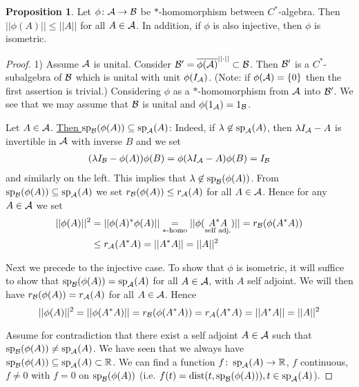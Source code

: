 \documentclass[10pt,english,a4paper]{article}
\theoremstyle{definition}
\newtheorem*{proposition}{Proposition}
\DeclareMathOperator{\Sp}{sp}
\begin{document}
\begin{proposition}
    Let $\phi \colon \mathcal{A}\to\mathcal{B}$ be $*$-homomorphism between $C^*$-algebra. 
Then $||\phi(A)|| \leq ||A||$ for all $A \in \mathcal{A}$. In addition, 
if $\phi$ is also injective, then $\phi$ is isometric.
\end{proposition}
\begin{proof}
    1) Assume $\mathcal{A}$ is unital. Consider $\mathcal{B}' = \overline{\phi(\mathcal{A})}^{||\cdot||} \subset \mathcal{B}$.
    Then $\mathcal{B}'$ is a $C^*$-subalgebra of $\mathcal{B}$ which is unital with unit $\phi(I_{\mathcal{A}})$.
    (Note: if $\phi(\mathcal{A})  = \{0\}$ then the first assertion is trivial.) Considering 
    $\phi$ as a $*$-homomorphism from $\mathcal{A}$ into $\mathcal{B}'$. We see that we may assume that 
$\mathcal{B}$ is unital and $\phi(1_{\mathcal{A}}) = 1_{\mathcal{B}}$. 

Let $A \in \mathcal{A}$. \ul{Then $\Sp_{\Bs}(\phi(A))\subseteq \Sp_{\As}(A)$}:
Indeed, if $\la \not\in \Sp_{\As}(A)$, then $\lambda I_{\mathcal{A}} - A$ is invertible in 
$\mathcal{A}$ with inverse $B$ and we set 
\begin{align*}
    (\lambda I_{\mathcal{B}} - \phi(A) )\phi(B) = \phi(\lambda I_{\mathcal{A}} - A)\phi(B) = I_{\mathcal{B}}
\end{align*}
and similarly on the left. This implies that $\la \not \in \Sp_{\Bs}(\phi(A))$. 
From $\Sp_{\Bs}(\phi(A))\subseteq \Sp_{\As}(A)$ we set 
$r_{\mathcal{B}} (\phi(A)) \leq r_{\mathcal{A}}(A)$ for all $A \in \mathcal{A}$. Hence for any $A \in \mathcal{A}$
we set 
\begin{align*}
    ||\phi(A)||^2 &= ||\phi(A)^*\phi(A)|| \underset{*\text{-homo}}{=}
    ||\phi(\underset{\text{self adj.}}{A^*A})|| = r_{\mathcal{B}}(\phi(A^*A)) \\
    &\leq r_{\mathcal{A}}(A^*A) = ||A^*A|| = ||A||^2
\end{align*}

Next we precede to the injective case. To show that $\phi$ is isometric, it will 
suffice to show that $\Sp_{\Bs}(\phi(A)) = \Sp_{\As}(A)$ for all $A \in \mathcal{A}$, with $A$ self adjoint.
We will then have $r_{\mathcal{B}}(\phi(A)) = r_{\mathcal{A}}(A)$ for all $A \in \mathcal{A}$. Hence 
\[||\phi(A)||^2 = ||\phi(A^*A)|| = r_{\mathcal{B}}(\phi(A^*A)) = r_{\mathcal{A}}(A^*A) 
= ||A^*A|| = ||A||^2 \]

Assume for contradiction that there exist a self adjoint $A \in \mathcal{A}$ such that 
$\Sp_{\Bs}(\phi(A)) \neq \Sp_{\As}(A)$. We have seen that we always have 
$\Sp_{\Bs}(\phi(A)) \subseteq \Sp_{\As}(A) \subset \R$. 
We can find a function $f \colon \Sp_{\As}(A) \to \R$, $f$ continuous, $f \neq 0$
with $f=0$ on $\Sp_{\Bs}(\phi(A))$ (i.e. $f(t) = \text{dist}(t, \Sp_{\Bs}(\phi(A))), t \in \Sp_{\As}(A)$).


\end{proof}
\end{document}
